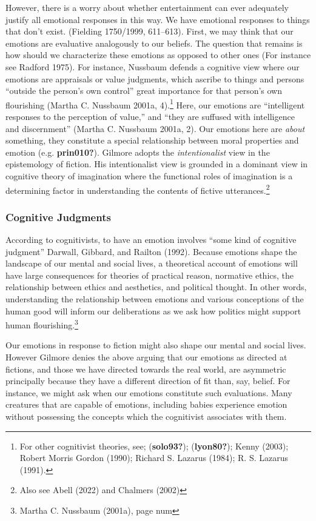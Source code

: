 \documentclass[12pt]{book}
\theoremstyle{definition}
\theoremstyle{remark}
\begin{document}
However, there is a worry about whether entertainment can ever adequately justify all emotional responses in this way. We have emotional responses to things that don't exist. (Fielding 1750/1999, 611--613). First, we may think that our emotions are evaluative analogously to our beliefs. The question that remains is how should we characterize these emotions as opposed to other ones (For instance see Radford 1975). For instance, Nussbaum defends a cognitive view where our emotions are appraisals or value judgments, which ascribe to things and persons ``outside the person's own control'' great importance for that person's own flourishing (Martha C. Nussbaum 2001a, 4).\footnote{For other cognitivist theories, see; (\textbf{solo93?}); (\textbf{lyon80?}); Kenny (2003); Robert Morris Gordon (1990); Richard S. Lazarus (1984); R. S. Lazarus (1991).} Here, our emotions are ``intelligent responses to the perception of value,'' and ``they are suffused with intelligence and discernment'' (Martha C. Nussbaum 2001a, 2). Our emotions here are \emph{about} something, they constitute a special relationship between moral properties and emotion (e.g. \textbf{prin010?}). Gilmore adopts the \emph{intentionalist} view in the epistemology of fiction. His intentionalist view is grounded in a dominant view in cognitive theory of imagination where the functional roles of imagination is a determining factor in understanding the contents of fictive utterances.\footnote{Also see Abell (2022) and Chalmers (2002)}

\subsubsection*{Cognitive Judgments}\label{cognitive-judgments}

According to cognitivists, to have an emotion involves ``some kind of cognitive judgment'' Darwall, Gibbard, and Railton (1992). Because emotions shape the landscape of our mental and social lives, a theoretical account of emotions will have large consequences for theories of practical reason, normative ethics, the relationship between ethics and aesthetics, and political thought. In other words, understanding the relationship between emotions and various conceptions of the human good will inform our deliberations as we ask how politics might support human flourishing.\footnote{Martha C. Nussbaum (2001a), page num}

Our emotions in response to fiction might also shape our mental and social lives. However Gilmore denies the above arguing that our emotions as directed at fictions, and those we have directed towards the real world, are asymmetric principally because they have a different direction of fit than, say, belief. For instance, we might ask when our emotions constitute such evaluations. Many creatures that are capable of emotions, including babies experience emotion without possessing the concepts which the cognitivist associates with them.
\end{document}
